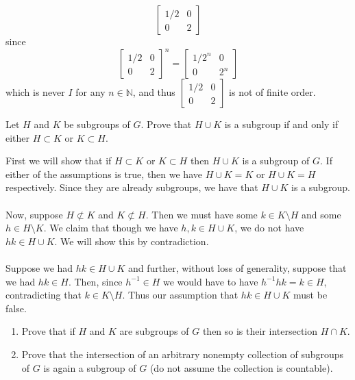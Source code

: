\documentclass[12 pt, letterpaper]{hmcpset}
\begin{document}
\begin{solution}
\[\begin{bmatrix}
				1/2 & 0 \\
				0 & 2
			\end{bmatrix}
		\]
		since
		\[
			\begin{bmatrix}
				1/2 & 0 \\
				0 & 2
			\end{bmatrix}^n =
			\begin{bmatrix}
				1/2^n & 0 \\
				0 & 2^n
			\end{bmatrix}
		\]
		which is never $I$ for any $n \in \mathbb{N}$, and thus $\begin{bmatrix}
			1/2 & 0 \\
			0 & 2
		\end{bmatrix}$ is not of finite order.
\end{solution}

\pagebreak

\begin{problem}
	Let $H$ and $K$ be subgroups of $G$. Prove that $H \cup K$ is a subgroup if and only if either $H \subset K$ or $K \subset H$.
\end{problem}

\begin{solution}
	First we will show that if $H \subset K$ or $K \subset H$  then $H \cup K$ is a subgroup of $G$. If either of the assumptions is true, then we have $H \cup K = K$ or $H \cup K = H$ respectively. Since they are already subgroups, we have that $H \cup K$ is a subgroup. \\\\
	Now, suppose $H \not \subset K$ and $K \not \subset H$. Then we must have some $k \in K \setminus H$ and some $h \in H \setminus K$. We claim that though we have $h, k \in H \cup K$, we do not have $hk \in H \cup K$. We will show this by contradiction. \\\\
	Suppose we had $hk \in H \cup K$ and further, without loss of generality, suppose that we had $hk \in H$. Then, since $h^{-1} \in H$ we would have to have $h^{-1}hk = k \in H$, contradicting that $k \in K \setminus H$. Thus our assumption that $hk \in H \cup K$ must be false.
\end{solution}

\pagebreak

\begin{problem}
	\begin{enumerate}
		\item Prove that if $H$ and $K$ are subgroups of $G$ then so is their intersection $H \cap K$.
		\item Prove that the intersection of an arbitrary nonempty collection of subgroups of $G$ is again a subgroup of $G$ (do not assume the collection is countable).
	\end{enumerate}
\end{problem}
\end{document}
